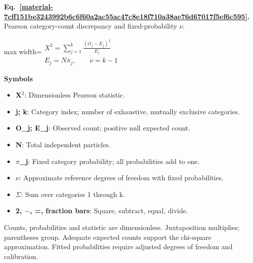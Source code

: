 \documentclass[11pt,a4paper]{article}
\begin{document}
\par\medskip
\noindent\begin{minipage}{\linewidth}
\label{material-7cff151be3243992b6c6f60a2ac55ac47c8e18f710a38ae76d67017f5ef6c595}
\noindent\textbf{Eq.~\ref*{material-7cff151be3243992b6c6f60a2ac55ac47c8e18f710a38ae76d67017f5ef6c595}.} Pearson category-count discrepancy and fixed-probability \ensuremath{\nu}.\par\nopagebreak
\begin{center}\begin{adjustbox}{max width=\linewidth}$\displaystyle \begin{gathered}X^2=\sum_{j=1}^{k}\frac{(O_j-E_j)^2}{E_j}\\E_j=N\pi_j,\qquad \nu=k-1\end{gathered}$\end{adjustbox}\end{center}

\par\noindent\textbf{Symbols}

\begin{itemize}\setlength{\itemsep}{1pt}\setlength{\parsep}{0pt}
\item \textbf{X\ensuremath{{}^2}}: Dimensionless Pearson statistic.
\item \textbf{j; k}: Category index; number of exhaustive, mutually exclusive categories.
\item \textbf{O\_j; E\_j}: Observed count; positive null expected count.
\item \textbf{N}: Total independent particles.
\item \textbf{\ensuremath{\pi}\_j}: Fixed category probability; all probabilities add to one.
\item \textbf{\ensuremath{\nu}}: Approximate reference degrees of freedom with fixed probabilities.
\item \textbf{\ensuremath{\Sigma}}: Sum over categories 1 through k.
\item \textbf{2, \ensuremath{-}, =, fraction bars}: Square, subtract, equal, divide.
\end{itemize}

Counts, probabilities and statistic are dimensionless. Juxtaposition multiplies; parentheses group. Adequate expected counts support the chi-square approximation. Fitted probabilities require adjusted degrees of freedom and calibration.

\end{minipage}\par
\medskip
\end{document}
